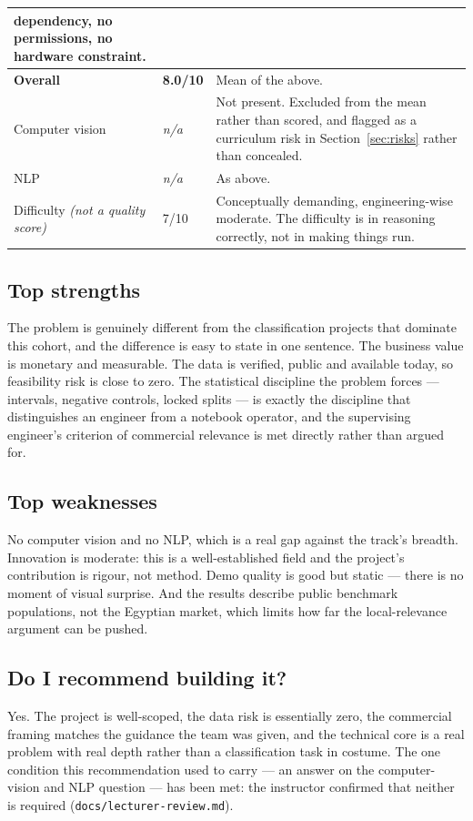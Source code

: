 \documentclass[11pt,a4paper]{article}
\begin{document}
\begin{longtable}{@{}L{4.4cm}L{1.6cm}L{8.0cm}@{}}
dependency, no permissions, no hardware constraint. \\
\midrule
\textbf{Overall} & \textbf{8.0/10} & Mean of the above. \\
\midrule
Computer vision & \emph{n/a} & Not present. Excluded from the mean rather than scored, and flagged
as a curriculum risk in Section~\ref{sec:risks} rather than concealed. \\
NLP & \emph{n/a} & As above. \\
Difficulty \emph{(not a quality score)} & 7/10 & Conceptually demanding, engineering-wise moderate.
The difficulty is in reasoning correctly, not in making things run. \\
\bottomrule
\end{longtable}

\subsection{Top strengths}

The problem is genuinely different from the classification projects that dominate this cohort, and
the difference is easy to state in one sentence. The business value is monetary and measurable. The
data is verified, public and available today, so feasibility risk is close to zero. The statistical
discipline the problem forces --- intervals, negative controls, locked splits --- is exactly the
discipline that distinguishes an engineer from a notebook operator, and the supervising engineer's
criterion of commercial relevance is met directly rather than argued for.

\subsection{Top weaknesses}

No computer vision and no NLP, which is a real gap against the track's breadth. Innovation is
moderate: this is a well-established field and the project's contribution is rigour, not method.
Demo quality is good but static --- there is no moment of visual surprise. And the results describe
public benchmark populations, not the Egyptian market, which limits how far the local-relevance
argument can be pushed.

\subsection{Do I recommend building it?}

\begin{goodbox}
Yes. The project is well-scoped, the data risk is essentially zero, the commercial framing matches
the guidance the team was given, and the technical core is a real problem with real depth rather
than a classification task in costume. The one condition this recommendation used to carry --- an
answer on the computer-vision and NLP question --- has been met: the instructor confirmed that
neither is required (\texttt{docs/lecturer-review.md}).
\end{goodbox}
\end{document}
